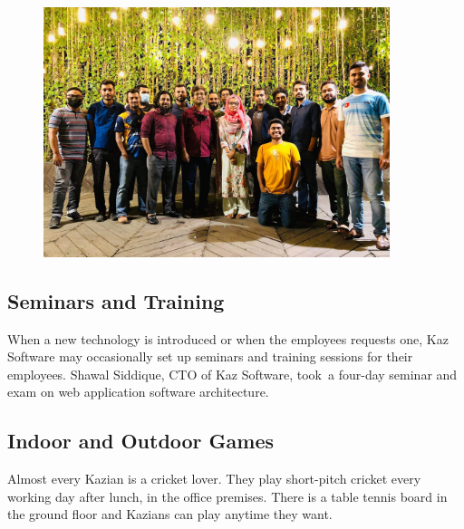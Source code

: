 \begin{figure}[h]
    \begin{center}
        \includegraphics[width=0.9\textwidth]{images/Chapter2/green_lounge.jpeg}
        \label{fig:CEO_Tour}
    \end{center}
\end{figure}

\subsection{Seminars and Training}

When a new technology is introduced or when the employees requests one, Kaz Software may occasionally set up seminars and training sessions for their employees.
Shawal Siddique, CTO of Kaz Software, took a four-day seminar and exam on web application software architecture.\\

\subsection{Indoor and Outdoor Games}

Almost every Kazian is a cricket lover.
They play short-pitch cricket every working day after lunch, in the office premises.
There is a table tennis board in the ground floor and Kazians can play anytime they want.\\

